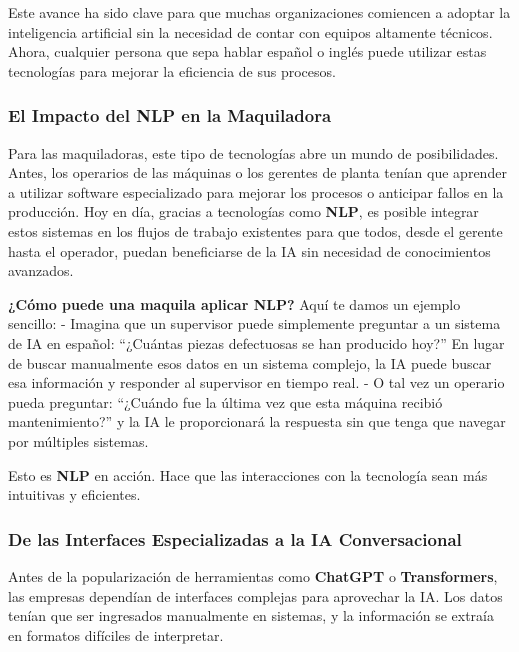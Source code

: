 \documentclass[
  10pt,
  letterpaper,
]{book}
\begin{document}
Este avance ha sido clave para que muchas organizaciones comiencen a
adoptar la inteligencia artificial sin la necesidad de contar con
equipos altamente técnicos. Ahora, cualquier persona que sepa hablar
español o inglés puede utilizar estas tecnologías para mejorar la
eficiencia de sus procesos.

\subsubsection{\texorpdfstring{\textbf{El Impacto del NLP en la
Maquiladora}}{El Impacto del NLP en la Maquiladora}}\label{el-impacto-del-nlp-en-la-maquiladora}

Para las maquiladoras, este tipo de tecnologías abre un mundo de
posibilidades. Antes, los operarios de las máquinas o los gerentes de
planta tenían que aprender a utilizar software especializado para
mejorar los procesos o anticipar fallos en la producción. Hoy en día,
gracias a tecnologías como \textbf{NLP}, es posible integrar estos
sistemas en los flujos de trabajo existentes para que todos, desde el
gerente hasta el operador, puedan beneficiarse de la IA sin necesidad de
conocimientos avanzados.

\textbf{¿Cómo puede una maquila aplicar NLP?} Aquí te damos un ejemplo
sencillo: - Imagina que un supervisor puede simplemente preguntar a un
sistema de IA en español: ``¿Cuántas piezas defectuosas se han producido
hoy?'' En lugar de buscar manualmente esos datos en un sistema complejo,
la IA puede buscar esa información y responder al supervisor en tiempo
real. - O tal vez un operario pueda preguntar: ``¿Cuándo fue la última
vez que esta máquina recibió mantenimiento?'' y la IA le proporcionará
la respuesta sin que tenga que navegar por múltiples sistemas.

Esto es \textbf{NLP} en acción. Hace que las interacciones con la
tecnología sean más intuitivas y eficientes.

\subsubsection{\texorpdfstring{\textbf{De las Interfaces Especializadas
a la IA
Conversacional}}{De las Interfaces Especializadas a la IA Conversacional}}\label{de-las-interfaces-especializadas-a-la-ia-conversacional}

Antes de la popularización de herramientas como \textbf{ChatGPT} o
\textbf{Transformers}, las empresas dependían de interfaces complejas
para aprovechar la IA. Los datos tenían que ser ingresados manualmente
en sistemas, y la información se extraía en formatos difíciles de
interpretar.
\end{document}
